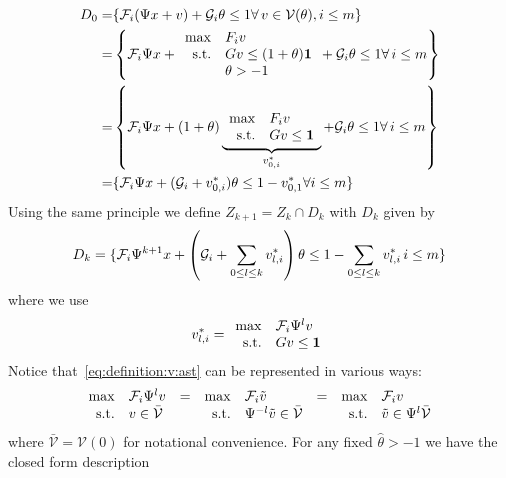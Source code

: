 \documentclass[letterpaper, 10pt, conference]{ieeeconf} %
\begin{document}
\begin{equation}\small
\begin{split}
	D_0 =& \{\mathcal F_i(\Psi x+v) + \mathcal G_i\theta \leq 1 \forall\, v\in\mathcal V(\theta), i\leq m\}\\
	=&\left\{\mathcal F_i\Psi x + \begin{array}{rl}\max& F_i v \\ \text{s.t.}& Gv \leq 
	(1+\theta){\bf{1}} \\ &\theta>-1\end{array}
	 + \mathcal G_i \theta \leq 1 \forall\, i\leq m\right\}\\
	=&\left\{\mathcal F_i\Psi x + (1+\theta)\underbrace{\begin{array}{rl}\max& F_i v \\ 
	\text{s.t.}& Gv \leq {\bf{1}}\end{array}}_{v_{0,i}^\ast}
	 + \mathcal G_i \theta \leq 1 \forall\, i\leq m\right\}\\
	=&\{\mathcal F_i\Psi x + (\mathcal G_i + v_{0,i}^\ast)\theta \leq 1 - v_{0,1}^\ast \forall i\leq m
	\}
\end{split}\end{equation}
%
Using the same principle we define $Z_{k+1}=Z_k\cap D_k$ with $D_k$ given by
%
\begin{equation}\label{eq:parametrised:Dk}\small
	D_k = \{\mathcal F_i\Psi^{k+1}x+ \left(\mathcal G_i +\sum_{0\leq l\leq k} v_{l,i}^\ast\right)\theta \leq 1 
	- \sum_{0\leq l\leq k} v_{l,i}^\ast\, i\leq m\}
\end{equation}
%
where we use 
%
\begin{equation}\label{eq:definition:v:ast}
v_{l,i}^\ast = \begin{array}{rl}\max & \mathcal F_i \Psi^{l} v \\ \text{s.t.}& Gv\leq{\bf{1}}
\end{array}
\end{equation}
%
Notice that~\eqref{eq:definition:v:ast} can be represented in various ways:
%
\[
\small
\begin{array}{rlcrlcrl}
\max&\mathcal F_i \Psi^l v &=& \max&\mathcal F_i \tilde  v &=& \max&\mathcal F_i v \\ 
\text{s.t.}&v\in\bar{\mathcal{V}} & & \text{s.t.}&\Psi^{-l} \tilde v\in\bar{\mathcal{V}} & &
\text{s.t.}& \tilde v\in\Psi^l\bar{\mathcal{V}}
\end{array}
\]
%
where $\bar{\mathcal{V}}=\mathcal V(0)$ for notational convenience. For any fixed $\hat\theta>-1$
we have the closed form description
\end{document}
